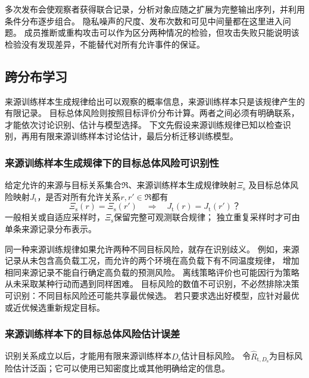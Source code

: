 多次发布会使观察者获得联合记录，分析对象应随之扩展为完整输出序列，并利用条件分布逐步组合。
隐私噪声的尺度、发布次数和可见中间量都在这里进入问题。
成员推断或重构攻击可以作为区分两种情况的检验，但攻击失败只能说明该检验没有发现差异，不能替代对所有允许事件的保证。

\subsection{跨分布学习}
\label{sec:future-transfer-theory-map}

来源训练样本生成规律给出可以观察的概率信息，来源训练样本只是该规律产生的有限记录。
目标总体风险则按照目标评价分布计算。两者之间必须有明确联系，才能依次讨论识别、估计与模型选择。
下文先假设来源训练规律已知以检查识别，再用有限来源训练样本讨论估计，最后分析迁移训练模型。

\subsubsection{来源训练样本生成规律下的目标总体风险可识别性}
\label{sec:future-analysis-source-target}

\begin{mathproblem}[来源训练规律是否确定目标总体风险]
  \label{question:future-source-target}
  给定允许的来源与目标关系集合$\mathfrak R$、来源训练样本生成规律映射$\Xi_{\mathrm s}$
  及目标总体风险映射$J_{\mathrm t}$，是否对所有允许关系$r,r'\in\mathfrak R$都有
  \[
    \Xi_{\mathrm s}(r)=\Xi_{\mathrm s}(r')
    \quad\Longrightarrow\quad J_{\mathrm t}(r)=J_{\mathrm t}(r')\text{？}
  \]
  一般相关或自适应采样时，$\Xi_{\mathrm s}$保留完整可观测联合规律；
  独立重复采样时才可由单条来源记录分布表示。
\end{mathproblem}

同一种来源训练规律如果允许两种不同目标风险，就存在识别歧义。
例如，来源记录从未包含高负载工况，而允许的两个环境在高负载下有不同温度规律，
增加相同来源记录不能自行确定高负载的预测风险。
离线策略评价也可能因行为策略从未采取某种行动而遇到同样困难。
目标风险的数值不可识别，不必然排除决策可识别：不同目标风险还可能共享最优候选。
若只要求选出好模型，应针对最优或近优候选重新规定目标。

\subsubsection{来源训练样本下的目标总体风险估计误差}
\label{sec:future-analysis-source-target-estimation}

识别关系成立以后，才能用有限来源训练样本$D_{\mathrm s}$估计目标风险。
令$\widehat R_{\mathrm t,D_{\mathrm s}}$为目标风险估计泛函；它可以使用已知密度比或其他明确给定的信息。

